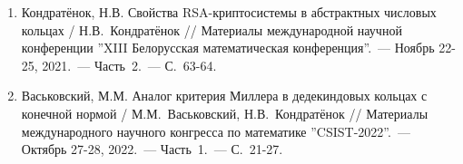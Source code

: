 \documentclass[_00_autoref.tex]{subfiles}
\begin{document}
\begin{enumerate}
    \item \label{source:XIII_Belarussian_math_conference_2021}
    Кондратёнок, Н.В. Свойства RSA-криптосистемы в абстрактных числовых кольцах / Н.В.~Кондратёнок // Материалы международной научной конференции ''XIII Белорусская математическая конференция''.~--- Ноябрь 22-25, 2021.~--- Часть~2.~--- С.~63-64.

    \item \label{source:CSIST_2022}
    Васьковский, М.М. Аналог критерия Миллера в дедекиндовых кольцах с конечной нормой / М.М.~Васьковский, Н.В.~Кондратёнок // Материалы международного научного конгресса по математике ''CSIST-2022''.~--- Октябрь 27-28, 2022.~--- Часть~1.~--- С.~21-27.

\end{enumerate}
\end{document}
